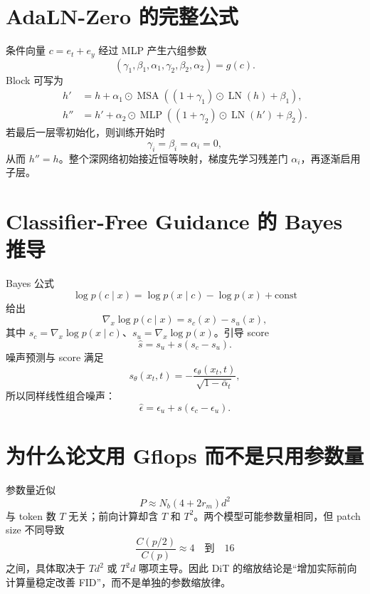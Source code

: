 \documentclass[UTF8,12pt,a4paper,fontset=none]{ctexart}
\numberwithin{equation}{section}
\begin{document}
\section{AdaLN-Zero 的完整公式}
条件向量 $c=e_t+e_y$ 经过 MLP 产生六组参数
\begin{equation}
 (\gamma_1,\beta_1,\alpha_1,\gamma_2,\beta_2,\alpha_2)=g(c).
\end{equation}
Block 可写为
\begin{align}
 h'&=h+\alpha_1\odot \operatorname{MSA}((1+\gamma_1)\odot\operatorname{LN}(h)+\beta_1),\\
 h''&=h'+\alpha_2\odot \operatorname{MLP}((1+\gamma_2)\odot\operatorname{LN}(h')+\beta_2).
\end{align}
若最后一层零初始化，则训练开始时
\begin{equation}
 \gamma_i=\beta_i=\alpha_i=0,
\end{equation}
从而 $h''=h$。整个深网络初始接近恒等映射，梯度先学习残差门 $\alpha_i$，再逐渐启用子层。

\section{Classifier-Free Guidance 的 Bayes 推导}
Bayes 公式
\begin{equation}
 \log p(c\mid x)=\log p(x\mid c)-\log p(x)+\text{const}
\end{equation}
给出
\begin{equation}
 \nabla_x\log p(c\mid x)=s_c(x)-s_u(x),
\end{equation}
其中 $s_c=\nabla_x\log p(x\mid c)$、$s_u=\nabla_x\log p(x)$。引导 score
\begin{equation}
 \widehat s=s_u+s(s_c-s_u).
\end{equation}
噪声预测与 score 满足
\begin{equation}
 s_\theta(x_t,t)=-\frac{\epsilon_\theta(x_t,t)}{\sqrt{1-\bar\alpha_t}},
\end{equation}
所以同样线性组合噪声：
\begin{equation}
 \boxed{\widehat\epsilon=\epsilon_u+s(\epsilon_c-\epsilon_u)}.
\end{equation}

\section{为什么论文用 Gflops 而不是只用参数量}
参数量近似
\begin{equation}
 P\approx N_b(4+2r_m)d^2
\end{equation}
与 token 数 $T$ 无关；前向计算却含 $T$ 和 $T^2$。两个模型可能参数量相同，但 patch size 不同导致
\begin{equation}
 \frac{C(p/2)}{C(p)}\approx4\quad\text{到}\quad16
\end{equation}
之间，具体取决于 $Td^2$ 或 $T^2d$ 哪项主导。因此 DiT 的缩放结论是“增加实际前向计算量稳定改善 FID”，而不是单独的参数缩放律。
\end{document}
